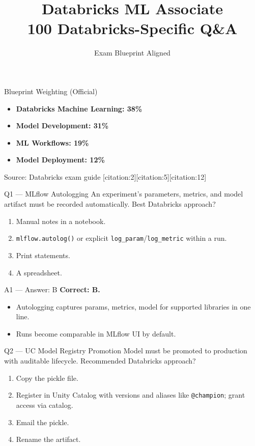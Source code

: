 \documentclass[aspectratio=169,9pt]{beamer}
\title{Databricks ML Associate\\100 Databricks-Specific Q\&A}
\author{Exam Blueprint Aligned}
\date{}
\begin{document}
	
	\frame{\titlepage}
	
	\begin{frame}{Blueprint Weighting (Official)}
		\begin{itemize}
			\item \textbf{Databricks Machine Learning: 38\%}
			\item \textbf{Model Development: 31\%}
			\item \textbf{ML Workflows: 19\%}
			\item \textbf{Model Deployment: 12\%}
		\end{itemize}
		\vspace{0.3cm}
		\small Source: Databricks exam guide [citation:2][citation:5][citation:12]
	\end{frame}
	
	
	\begin{frame}{Q1 — MLflow Autologging}
		An experiment's parameters, metrics, and model artifact must be recorded automatically. Best Databricks approach?
		\begin{enumerate}[label=\Alph*.]
			\item Manual notes in a notebook.
			\item \texttt{mlflow.autolog()} or explicit \texttt{log\_param}/\texttt{log\_metric} within a run.
			\item Print statements.
			\item A spreadsheet.
		\end{enumerate}
	\end{frame}
	
	\begin{frame}{A1 — Answer: B}
		\textbf{Correct: B.}
		\begin{itemize}
			\item Autologging captures params, metrics, model for supported libraries in one line.
			\item Runs become comparable in MLflow UI by default.
		\end{itemize}
	\end{frame}
	
	\begin{frame}{Q2 — UC Model Registry Promotion}
		Model must be promoted to production with auditable lifecycle. Recommended Databricks approach?
		\begin{enumerate}[label=\Alph*.]
			\item Copy the pickle file.
			\item Register in Unity Catalog with versions and aliases like \texttt{@champion}; grant access via catalog.
			\item Email the pickle.
			\item Rename the artifact.
		\end{enumerate}
	\end{frame}
	
\end{document}
